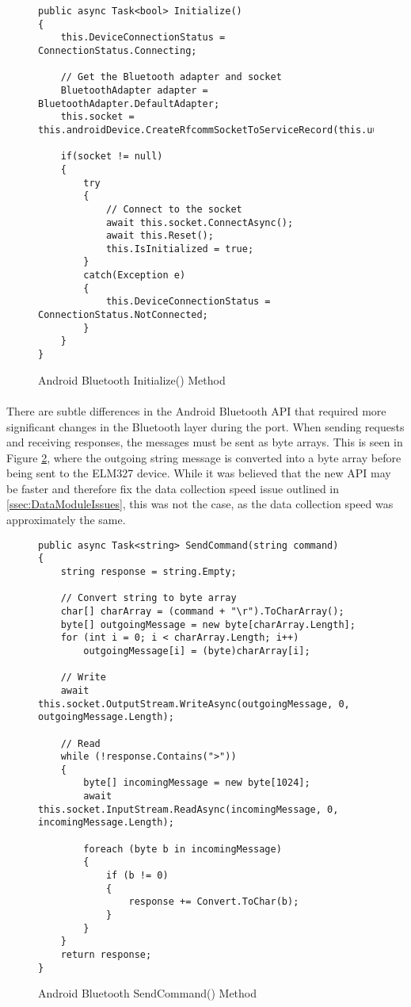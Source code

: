 		\begin{figure}[h]
			\begin{lstlisting}
public async Task<bool> Initialize()
{
	this.DeviceConnectionStatus = ConnectionStatus.Connecting;
	
	// Get the Bluetooth adapter and socket
    BluetoothAdapter adapter = BluetoothAdapter.DefaultAdapter;
	this.socket = this.androidDevice.CreateRfcommSocketToServiceRecord(this.uuid);
    
    if(socket != null)
	{
		try
		{
			// Connect to the socket
			await this.socket.ConnectAsync();                           
			await this.Reset();
			this.IsInitialized = true;
		}
		catch(Exception e)
		{
			this.DeviceConnectionStatus = ConnectionStatus.NotConnected;
		}                        
	}
}
			\end{lstlisting}
			\caption{Android Bluetooth Initialize() Method}
			\label{code:AndroidBluetoothInit}
		\end{figure}		

		\paragraph{}{
		There are subtle differences in the Android Bluetooth API that required more significant changes in the Bluetooth layer during the port. When sending requests and receiving responses, the messages must be sent as byte arrays. This is seen in Figure \ref{code:AndroidBluetoothSend}, where the outgoing string message is converted into a byte array before being sent to the ELM327 device. While it was believed that the new API may be faster and therefore fix the data collection speed issue outlined in \ref{ssec:DataModuleIssues}, this was not the case, as the data collection speed was approximately the same.
		}

		\begin{figure}[h]
			\begin{lstlisting}
public async Task<string> SendCommand(string command)
{
    string response = string.Empty;

	// Convert string to byte array
	char[] charArray = (command + "\r").ToCharArray();
	byte[] outgoingMessage = new byte[charArray.Length];
	for (int i = 0; i < charArray.Length; i++)
		outgoingMessage[i] = (byte)charArray[i];

	// Write
	await this.socket.OutputStream.WriteAsync(outgoingMessage, 0, outgoingMessage.Length);

	// Read
	while (!response.Contains(">"))
	{
		byte[] incomingMessage = new byte[1024];
		await this.socket.InputStream.ReadAsync(incomingMessage, 0, incomingMessage.Length);

		foreach (byte b in incomingMessage)
		{
			if (b != 0)
			{
				response += Convert.ToChar(b);
			}
		}    
	}
	return response;
}
			\end{lstlisting}
			\caption{Android Bluetooth SendCommand() Method}
			\label{code:AndroidBluetoothSend}
		\end{figure}
		
